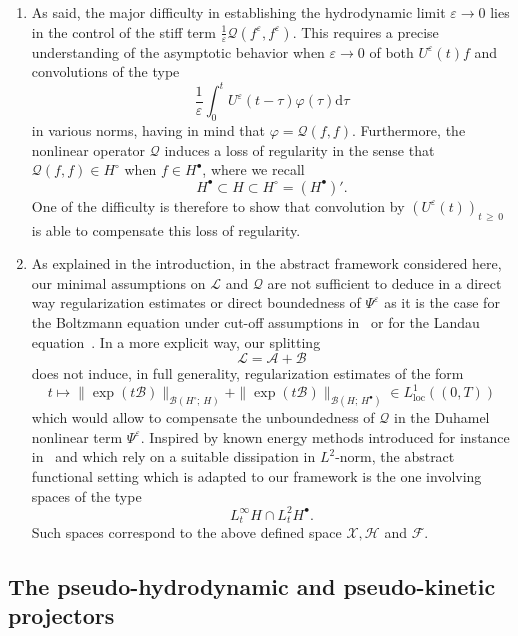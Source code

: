 \documentclass[10pt]{amsart}
\theoremstyle{definition}\newtheorem{defi}[theo]{Definition}\newtheorem{rema}[theo]{Remark}\newtheorem{exam}[theo]{Example}\newtheorem{exem}[theo]{Example}\newtheorem{nota}[theo]{Notation}
\renewcommand{\d}{\mathrm{d}}
\renewcommand{\AA}{\mathcal{A}}
\newcommand{\BB}{\mathcal{B}}
\newcommand{\LL}{\mathcal{L}}
\newcommand{\QQ}{\mathcal{Q}}
\newcommand{\BBB}{\mathscr{B}}
\newcommand{\FFF}{\mathscr{F}}
\newcommand{\HHH}{\mathscr{H}}
\newcommand{\GGG}{\mathscr{X}}
\newcommand{\Ss}{H}
\newcommand{\Ssp}{H^{\bullet}}
\newcommand{\Ssm}{H^{\circ}}
\newcommand{\SSSs}{\HHH}
\newcommand{\SSSl}{\GGG}
\newcommand{\SSSm}{\FFF}
\renewcommand*\ge{\geqslant}
\newcommand*\eps{{\varepsilon}}
\begin{document}
\begin{enumerate}
\item As said, the major difficulty in establishing the hydrodynamic limit $\eps \to 0$ lies in the control of the stiff term $\frac{1}{\eps}\QQ(f^\eps,f^\eps)$. This requires a precise understanding of the asymptotic behavior when $\eps \to 0$ of both $U^\eps(t)f$ and convolutions of the type
\[
\frac{1}{\eps} \int_0^t U^\eps(t-\tau)\varphi(\tau)\d\tau
\]
in various norms, having in mind that $\varphi=\QQ(f,f)$. {Furthermore,} the nonlinear operator $\QQ$ induces a loss of regularity in the sense that $\QQ(f, f) \in \Ssm$ when $f \in \Ssp$, where we recall
\[
{\Ssp \subset \Ss \subset \Ssm = (\Ssp)'}.
\]
One of the difficulty is therefore to show that convolution by $(U^\eps(t))_{t\,\ge\,0}$ is able to compensate this loss of regularity.
\item As explained in the introduction, in the abstract framework considered here, our minimal assumptions on $\LL$ and $\QQ$ are not sufficient to deduce in a direct way regularization estimates or direct boundedness of $\Psi^\eps$ as it is the case for the Boltzmann equation under cut-off assumptions in~\cite{BU1991,GT2020} or for the Landau equation~\cite{CRT2022}. In a more explicit way, our splitting
\[
\LL=\AA+\BB
\]
does not induce, in full generality, regularization estimates of the form
\[
t \mapsto \| \exp(t \BB) \|_{ \BBB\left(\Ssm ;\,\Ss \right) } + \| \exp(t \BB) \|_{ \BBB\left(\Ss ;\,\Ssp \right) } \in L^1_{\text{loc}}((0,T))
\]
which would allow to compensate the unboundedness of $\QQ$ in the Duhamel nonlinear term $\Psi^\eps$. Inspired by known energy methods introduced for instance in~\cite{G2004} and which rely on a suitable dissipation in $L^2$-norm, the abstract functional setting which is adapted to our framework is the one involving spaces of the type
\[
L^\infty_t \Ss \cap L^2_t \Ssp.
\]
Such spaces correspond to the above defined space $\SSSl, \SSSs$ and $\SSSm$.
\end{enumerate}

\subsection{The pseudo-hydrodynamic and pseudo-kinetic projectors}\label{scn:pseudo_hydro_kinetic}
\end{document}
